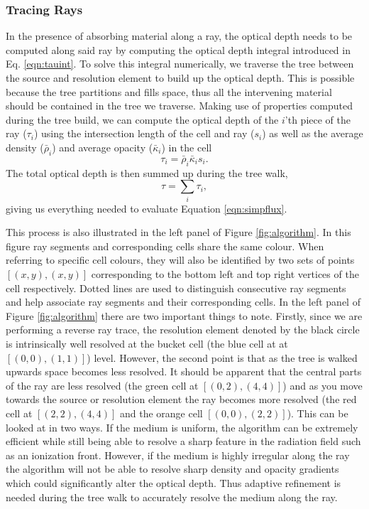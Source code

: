 \documentclass[fleq,usenatbib]{mnras}
\begin{document}
\subsubsection{Tracing Rays}
In the presence of absorbing material along a ray, the optical depth needs to 
be computed along said ray by computing the optical depth integral introduced 
in Eq. \ref{eqn:tauint}. To solve this integral numerically, we traverse the 
tree between the source and resolution element to build up the optical depth. 
This is possible because the tree partitions and fills space, thus all the 
intervening material should be contained in the tree we traverse. Making use 
of properties computed during the tree build, we can compute the optical depth 
of the $i$'th piece of the ray ($\tau_i$) using the intersection length 
of the cell and ray ($s_i$) as well as the average density ($\bar{\rho}_i$) 
and average opacity ($\bar{\kappa}_i$) in the cell
\begin{equation}
\label{eqn:taui}
\tau_i = \bar{\rho}_i \bar{\kappa}_i s_i.
\end{equation}
The total optical depth is then summed up during the tree walk,
\begin{equation}
\label{eqn:tausum}
\tau = \sum_i \tau_i,
\end{equation}
giving us everything needed to evaluate Equation \ref{eqn:simpflux}. 

This process is also illustrated in the left panel of Figure 
\ref{fig:algorithm}. In this figure ray segments and corresponding cells share 
the same colour. When referring to specific cell colours, they will also be 
identified by two sets of points $[(x,y),(x,y)]$ corresponding to the bottom 
left and top right vertices of the cell respectively. Dotted lines are used to 
distinguish consecutive ray segments and help associate ray segments and their 
corresponding cells. In the left panel of Figure \ref{fig:algorithm} there are 
two important things to note. Firstly, since we are performing a reverse ray 
trace, the resolution element denoted by the black circle is intrinsically 
well resolved at the bucket cell (the blue cell at at $[(0,0),(1,1)]$) level. 
However, the second point is that as the tree is walked upwards space becomes 
less resolved. It should be apparent that the central parts of the ray are 
less resolved (the green cell at $[(0,2),(4,4)]$) and as you move towards the 
source or resolution element the ray becomes more resolved (the red cell at 
$[(2,2),(4,4)]$ and the orange cell $[(0,0),(2,2)]$). This can be looked at in 
two ways. If the medium is uniform, the algorithm can be extremely efficient 
while still being able to resolve a sharp feature in the radiation field such 
as an ionization front. However, if the medium is highly irregular along the 
ray the algorithm will not be able to resolve sharp density and opacity 
gradients which could significantly alter the optical depth. Thus adaptive 
refinement is needed during the tree walk to accurately resolve the medium 
along the ray.
\end{document}
